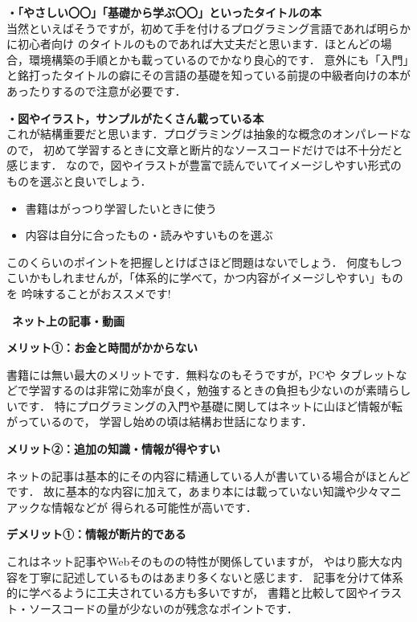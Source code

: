 \documentclass[autodetect-engine,dvi=dvipdfmx,ja=standard,a4j,12pt]{bxjsarticle}
\begin{document}
\begin{boxnote}
{\large \textbf{・「やさしい〇〇」「基礎から学ぶ〇〇」といったタイトルの本}} \\
当然といえばそうですが，初めて手を付けるプログラミング言語であれば明らかに初心者向け
のタイトルのものであれば大丈夫だと思います．ほとんどの場合，環境構築の手順とかも載っているのでかなり良心的です．
意外にも「入門」と銘打ったタイトルの癖にその言語の基礎を知っている前提の中級者向けの本があったりするので注意が必要です．

{\large \textbf{・図やイラスト，サンプルがたくさん載っている本}} \\
これが結構重要だと思います．プログラミングは抽象的な概念のオンパレードなので，
初めて学習するときに文章と断片的なソースコードだけでは不十分だと感じます．
なので，図やイラストが豊富で読んでいてイメージしやすい形式のものを選ぶと良いでしょう．
\end{boxnote}

\begin{itemize}
    \item 書籍はがっつり学習したいときに使う
    \item 内容は自分に合ったもの・読みやすいものを選ぶ
\end{itemize}
このくらいのポイントを把握しとけばさほど問題はないでしょう．
何度もしつこいかもしれませんが，「体系的に学べて，かつ内容がイメージしやすい」ものを
吟味することがおススメです!

\clearpage

\begin{itembox}[c]{\huge \ \textbf{ネット上の記事・動画}\ }
\begin{center}
    {\large \textbf{メリット①：お金と時間がかからない}} 
\end{center}
書籍には無い最大のメリットです．無料なのもそうですが，PCや
タブレットなどで学習するのは非常に効率が良く，勉強するときの負担も少ないのが素晴らしいです．
特にプログラミングの入門や基礎に関してはネットに山ほど情報が転がっているので，
学習し始めの頃は結構お世話になります．

\begin{center}
    {\large \textbf{メリット②：追加の知識・情報が得やすい}} 
\end{center}
ネットの記事は基本的にその内容に精通している人が書いている場合がほとんどです．
故に基本的な内容に加えて，あまり本には載っていない知識や少々マニアックな情報などが
得られる可能性が高いです．

\begin{center}
    {\large \textbf{デメリット①：情報が断片的である}} 
\end{center}
これはネット記事やWebそのものの特性が関係していますが，
やはり膨大な内容を丁寧に記述しているものはあまり多くないと感じます．
記事を分けて体系的に学べるように工夫されている方も多いですが，
書籍と比較して図やイラスト・ソースコードの量が少ないのが残念なポイントです．
\end{itembox}
\end{document}
